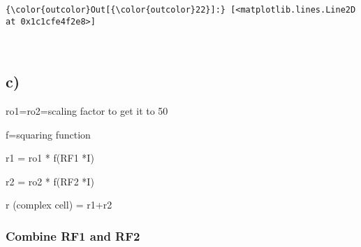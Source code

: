 \documentclass[11pt]{article}
\begin{document}
\begin{Verbatim}[commandchars=\\\{\}]
{\color{outcolor}Out[{\color{outcolor}22}]:} [<matplotlib.lines.Line2D at 0x1c1cfe4f2e8>]
\end{Verbatim}
            
    \begin{center}
    \end{center}
    { \hspace*{\fill} \\}
    
    \subsection{c)}\label{c}

ro1=ro2=scaling factor to get it to 50

f=squaring function

r1 = ro1 * f(RF1 *I)

r2 = ro2 * f(RF2 *I)

r (complex cell) = r1+r2

    \subsubsection{Combine RF1 and RF2}\label{combine-rf1-and-rf2}
\end{document}
